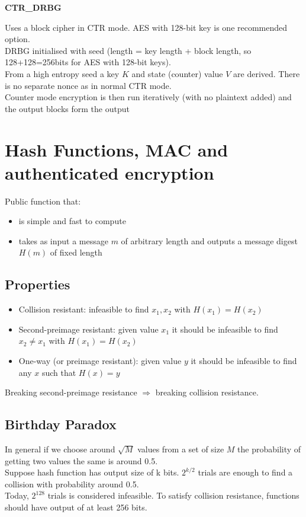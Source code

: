 \documentclass{article}
\begin{document}
\textbf{CTR\_DRBG}

Uses a block cipher in CTR mode. AES with 128-bit key is one recommended option.\\
DRBG initialised with seed (length = key length + block length, so 128+128=256bits for AES with 128-bit keys).\\
From a high entropy seed a key $K$ and state (counter) value $V$ are derived. There is no separate nonce as in normal CTR mode.\\
Counter mode encryption is then run iteratively (with no plaintext added) and the output blocks form the output

\newpage \section{Hash Functions, MAC and authenticated encryption}

Public function that:
\begin{itemize}
    \item is simple and fast to compute
    \item takes as input a message $m$ of arbitrary length and outputs a message digest $H(m)$ of fixed length
\end{itemize}

\subsection{Properties}

\begin{itemize}
    \item Collision resistant: infeasible to find $x_1, x_2$ with $H(x_1)=H(x_2)$
    \item Second-preimage resistant: given value $x_1$ it should be infeasible to find $x_2 \neq x_1$ with $H(x_1)=H(x_2)$
    \item One-way (or preimage resistant): given value $y$ it should be infeasible to find any $x$ such that $H(x)=y$
\end{itemize}
Breaking second-preimage resistance $\Rightarrow$ breaking collision resistance.

\subsection{Birthday Paradox}

In general if we choose around $\sqrt{M}$ values from a set of size $M$ the probability of getting two values the same is around 0.5.\\
Suppose hash function has output size of k bits. $2^{k/2}$ trials are enough to find a collision with probability around 0.5.\\
Today, $2^{128}$ trials is considered infeasible. To satisfy collision resistance, functions should have output of at least 256 bits.
\end{document}
